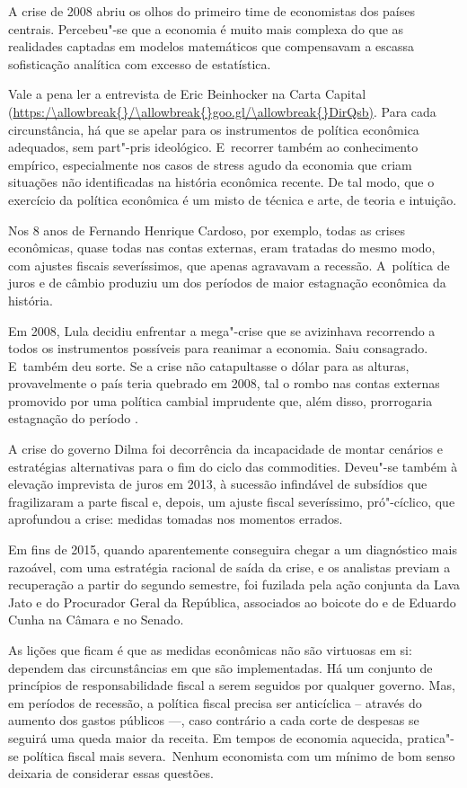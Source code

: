 A crise de 2008 abriu os olhos do primeiro time de economistas dos
países centrais. Percebeu"-se que a economia é muito mais complexa do que
as realidades captadas em modelos matemáticos que compensavam a escassa
sofisticação analítica com excesso de estatística.

Vale a pena ler a entrevista de Eric Beinhocker na Carta Capital
(\url{https:/\allowbreak{}/\allowbreak{}goo.gl/\allowbreak{}DirQsb)}. Para cada circunstância, há que se apelar
para os instrumentos de política econômica adequados, sem part"-pris
ideológico. E~recorrer também ao conhecimento empírico, especialmente
nos casos de stress agudo da economia que criam situações não
identificadas na história econômica recente. De tal modo, que o
exercício da política econômica é um misto de técnica e arte, de teoria
e intuição.

Nos 8 anos de Fernando Henrique Cardoso, por exemplo, todas as crises
econômicas, quase todas nas contas externas, eram tratadas do mesmo
modo, com ajustes fiscais severíssimos, que apenas agravavam a recessão.
A~política de juros e de câmbio produziu um dos períodos de maior
estagnação econômica da história.

Em 2008, Lula decidiu enfrentar a mega"-crise que se avizinhava
recorrendo a todos os instrumentos possíveis para reanimar a economia.
Saiu consagrado. E~também deu sorte. Se a crise não catapultasse o dólar
para as alturas, provavelmente o país teria quebrado em 2008, tal o
rombo nas contas externas promovido por uma política cambial imprudente
que, além disso, prorrogaria estagnação do período .

A crise do governo Dilma foi decorrência da incapacidade de montar
cenários e estratégias alternativas para o fim do ciclo das commodities.
Deveu"-se também à elevação imprevista de juros em 2013, à sucessão
infindável de subsídios que fragilizaram a parte fiscal e, depois, um
ajuste fiscal severíssimo, pró"-cíclico, que aprofundou a crise: medidas
tomadas nos momentos errados.

Em fins de 2015, quando aparentemente conseguira chegar a um diagnóstico
mais razoável, com uma estratégia racional de saída da crise, e os
analistas previam a recuperação a partir do segundo semestre, foi
fuzilada pela ação conjunta da Lava Jato e do Procurador Geral da
República, associados ao boicote do  e de Eduardo Cunha na Câmara e
no Senado.

As lições que ficam é que as medidas econômicas não são virtuosas em si:
dependem das circunstâncias em que são implementadas. Há um conjunto de
princípios de responsabilidade fiscal a serem seguidos por qualquer
governo. Mas, em períodos de recessão, a política fiscal precisa ser
anticíclica -- através do aumento dos gastos públicos \mbox{---,} caso
contrário a cada corte de despesas se seguirá uma queda maior da
receita. Em tempos de economia aquecida, pratica"-se política fiscal mais
severa.~Nenhum economista com um mínimo de bom senso deixaria de
considerar essas questões.~

